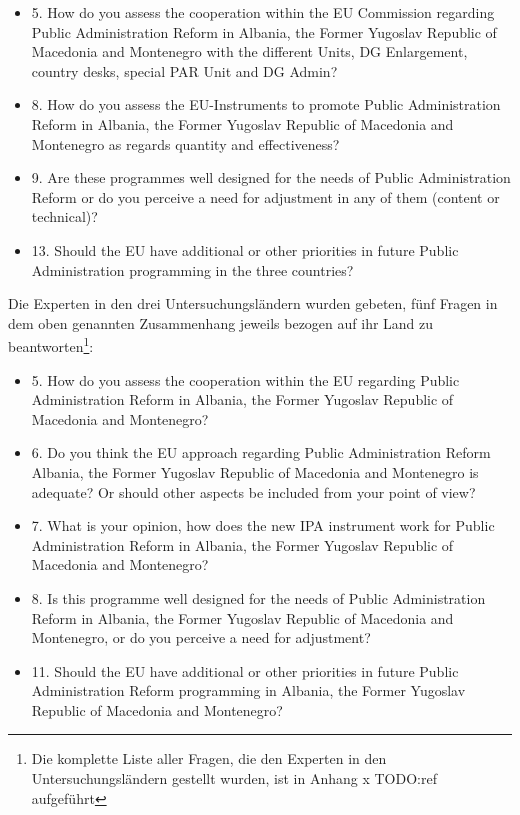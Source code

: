 \begin{itemize}
\item 5. How do you assess the cooperation within the EU Commission regarding Public Administration Reform in Albania, the Former Yugoslav Republic of Macedonia and Montenegro with the different Units, DG Enlargement, country desks, special PAR Unit and DG Admin?
\item 8. How do you assess the EU-Instruments to promote Public Administration Reform in Albania, the Former Yugoslav Republic of Macedonia and Montenegro as regards quantity and effectiveness?
\item 9. Are these programmes well designed for the needs of Public Administration Reform or do you perceive a need for adjustment in any of them (content or technical)?
\item 13. Should the EU have additional or other priorities in future Public Administration programming in the three countries?
\end{itemize}
Die Experten in den drei Untersuchungsländern wurden gebeten, fünf Fragen in dem oben genannten Zusammenhang jeweils bezogen auf ihr Land zu beantworten\footnote{Die komplette Liste aller Fragen, die den Experten in den Untersuchungsländern gestellt wurden, ist in Anhang x TODO:ref aufgeführt}:
\begin{itemize}
\item 5. How do you assess the cooperation within the EU regarding Public Administration Reform in Albania, the Former Yugoslav Republic of Macedonia and Montenegro?
\item 6. Do you think the EU approach regarding Public Administration Reform Albania, the Former Yugoslav Republic of Macedonia and Montenegro is adequate? Or should other aspects be included from your point of view?
\item 7. What is your opinion, how does the new IPA instrument work for Public Administration Reform in Albania, the Former Yugoslav Republic of Macedonia and Montenegro? 
\item 8. Is this programme well designed for the needs of Public Administration Reform in Albania, the Former Yugoslav Republic of Macedonia and Montenegro, or do you perceive a need for adjustment?
\item 11. Should the EU have additional or other priorities in future Public Administration Reform programming in Albania, the Former Yugoslav Republic of Macedonia and Montenegro?
\end{itemize}

